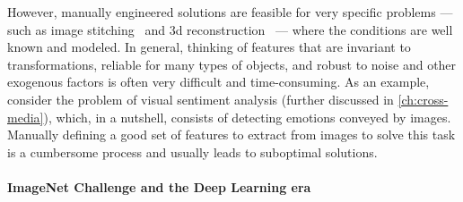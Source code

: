 However, manually engineered solutions are feasible for very specific problems --- such as image stitching~\cite{brown2007automatic} and 3d reconstruction~\cite{schonberger2016structure} --- where the conditions are well known and modeled.
In general, thinking of features that are invariant to transformations, reliable for many types of objects, and robust to noise and other exogenous factors is often very difficult and time-consuming.
As an example, consider the problem of visual sentiment analysis (further discussed in \ref{ch:cross-media}), which, in a nutshell, consists of detecting emotions conveyed by images.
Manually defining a good set of features to extract from images to solve this task is a cumbersome process and usually leads to suboptimal solutions.

\paragraph{ImageNet Challenge and the Deep Learning era}

